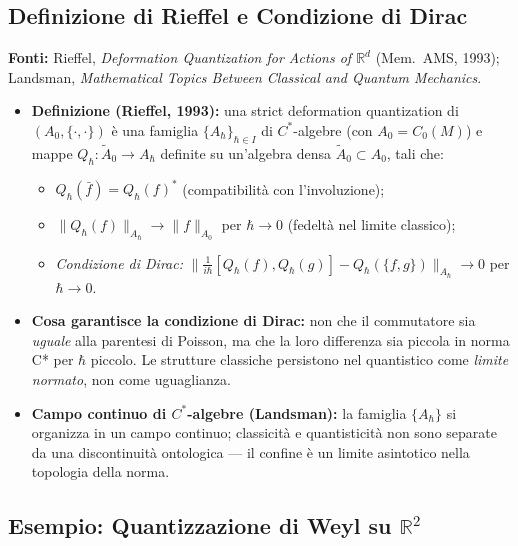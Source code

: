 \documentclass[12pt, a4paper]{article}
\newcommand{\fonti}[1]{%
	\begin{fontebox}
		\textcolor{fontecolor}{\footnotesize\textbf{Fonti:} #1}
	\end{fontebox}%
}
\begin{document}
	\subsection{Definizione di Rieffel e Condizione di Dirac}
	
	\fonti{Rieffel, \textit{Deformation Quantization for Actions of $\mathbb{R}^d$}
		(Mem.\ AMS, 1993); Landsman, \textit{Mathematical Topics Between Classical and
			Quantum Mechanics}.}
	
	\begin{itemize}
		\item \textbf{Definizione (Rieffel, 1993):} una strict deformation quantization
		di $(A_0, \{\cdot,\cdot\})$ è una famiglia $\{A_\hbar\}_{\hbar \in I}$ di
		$C^*$-algebre (con $A_0 = C_0(M)$) e mappe $Q_\hbar: \widetilde{A}_0 \to A_\hbar$
		definite su un'algebra densa $\widetilde{A}_0 \subset A_0$, tali che:
		\begin{itemize}
			\item[(i)] $Q_\hbar(\bar{f}) = Q_\hbar(f)^*$ (compatibilità con l'involuzione);
			\item[(ii)] $\|Q_\hbar(f)\|_{A_\hbar} \to \|f\|_{A_0}$ per $\hbar \to 0$
			(fedeltà nel limite classico);
			\item[(iii)] \emph{Condizione di Dirac:}
			$\bigl\|\tfrac{1}{i\hbar}[Q_\hbar(f), Q_\hbar(g)] - Q_\hbar(\{f,g\})\bigr\|_{A_\hbar}
			\to 0$ per $\hbar \to 0$.
		\end{itemize}
		\item \textbf{Cosa garantisce la condizione di Dirac:} non che il commutatore
		sia \emph{uguale} alla parentesi di Poisson, ma che la loro differenza sia piccola
		in norma C* per $\hbar$ piccolo. Le strutture classiche persistono nel quantistico
		come \emph{limite normato}, non come uguaglianza.
		\item \textbf{Campo continuo di $C^*$-algebre (Landsman):} la famiglia
		$\{A_\hbar\}$ si organizza in un campo continuo; classicità e quantisticità non
		sono separate da una discontinuità ontologica --- il confine è un limite
		asintotico nella topologia della norma.
	\end{itemize}
	
	\subsection{Esempio: Quantizzazione di Weyl su $\mathbb{R}^2$}
	
\end{document}
